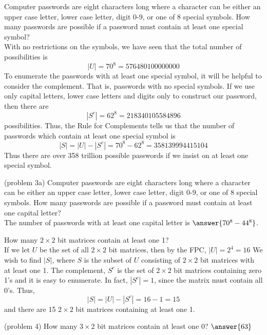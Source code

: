 \documentclass[handout]{ximera}
\begin{document}
\begin{example}[example 3]
Computer passwords are eight characters long where a character can be either an upper case letter, 
lower case letter, digit 0-9, or one of 8 special symbols. 
How many passwords are possible if a password must contain at least one special symbol?\\
With no restrictions on the symbols, we have seen that the total number of possibilities is 
\[
|U| = 70^8 = 576480100000000
\]
To enumerate the passwords with at least one special symbol, it will be helpful to consider the complement. 
That is, passwords with no special symbols. If we use only capital letters, 
lower case letters and digits only to construct our password, then there are
\[
|S^c| = 62^8 = 218340105584896
\]
possibilities. Thus, the Rule for Complements tells us that the number of passwords which contain at least one
special symbol is
\[
|S| = |U| - |S^c| = 70^8 - 62^8 = 358139994415104
\]
Thus there are over 358 trillion possible passwords if we insist on at least one special symbol.
\end{example}

\begin{problem}(problem 3a)
Computer passwords are eight characters long where a character can be either an upper case letter, 
lower case letter, digit 0-9, or one of 8 special symbols. 
How many passwords are possible if a password must contain at least one capital letter?\\
The number of passwords with at least one capital letter is  $\answer{70^8 - 44^8}$.
\end{problem}


\begin{example}[example 4]
How many $2 \times 2$ bit matrices contain at least one 1?\\
If we let $U$ be the set of all $2 \times 2$ bit matrices, then by the FPC, $|U| = 2^4 = 16$ We wish to find $|S|$,
where $S$ is the subset of $U$ consisting of $2 \times 2$ bit matrices with at least one 1. The complement, $S^c$
is the set of $2 \times 2$ bit matrices containing zero 1's and it is easy to enumerate.  In fact, $|S^c|= 1$, since the matrix must contain all 0's. Thus,
\[
|S| = |U| - |S^c| = 16 -1 = 15
\]
and there are 15 $2 \times 2$ bit matrices containing at least one 1.
\end{example}


\begin{problem}(problem 4)
How many $3 \times 2$ bit matrices contain at least one 0? \; $\answer{63}$
\end{problem}
\end{document}
